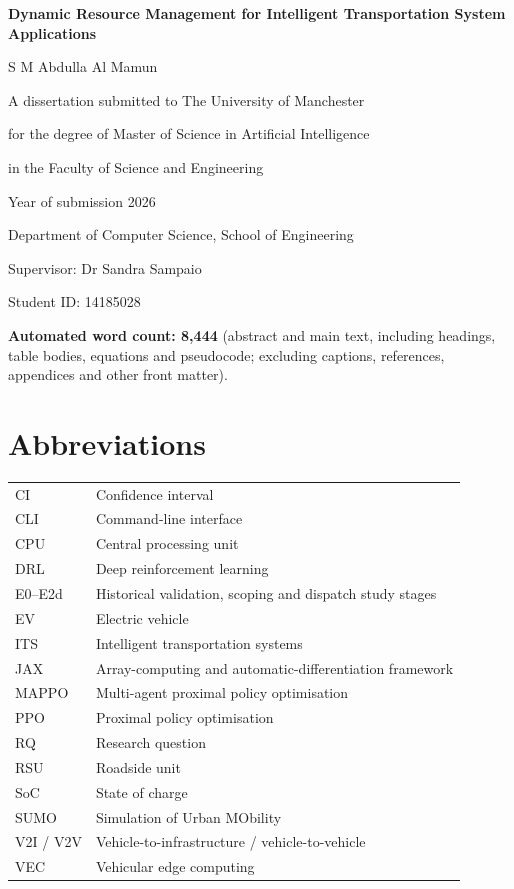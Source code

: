 \documentclass[12pt,a4paper]{article}
\begin{document}
\thispagestyle{empty}
\begin{center}
\vspace*{12mm}
\parbox{0.72\textwidth}{\centering\Large\bfseries Dynamic Resource Management for Intelligent Transportation System Applications\par}\par
\vspace{18mm}
{\large S M Abdulla Al Mamun\par}
\vspace{12mm}
A dissertation submitted to The University of Manchester\par
for the degree of Master of Science in Artificial Intelligence\par
in the Faculty of Science and Engineering\par
\vspace{8mm}
Year of submission 2026\par
\vspace{8mm}
Department of Computer Science, School of Engineering\par
\vspace{8mm}
Supervisor: Dr Sandra Sampaio\par
\end{center}
\vfill
\noindent Student ID: 14185028\par
\clearpage
\tableofcontents
\vfill\noindent\textbf{Automated word count: 8,444} (abstract and main text, including headings, table bodies, equations and pseudocode; excluding captions, references, appendices and other front matter).\par
\clearpage
{\footnotesize\singlespacing
\listoffigures
\listoftables
}
\clearpage
\section*{Abbreviations}
\begin{tabularx}{\textwidth}{@{}lX@{}}
CI & Confidence interval\\
CLI & Command-line interface\\
CPU & Central processing unit\\
DRL & Deep reinforcement learning\\
E0--E2d & Historical validation, scoping and dispatch study stages\\
EV & Electric vehicle\\
ITS & Intelligent transportation systems\\
JAX & Array-computing and automatic-differentiation framework\\
MAPPO & Multi-agent proximal policy optimisation\\
PPO & Proximal policy optimisation\\
RQ & Research question\\
RSU & Roadside unit\\
SoC & State of charge\\
SUMO & Simulation of Urban MObility\\
V2I / V2V & Vehicle-to-infrastructure / vehicle-to-vehicle\\
VEC & Vehicular edge computing\\
\end{tabularx}
\clearpage
\end{document}
